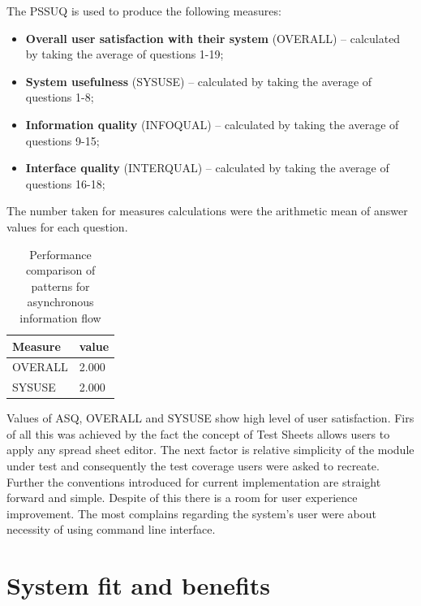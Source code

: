 The PSSUQ is used to produce the following measures:
\begin{itemize}
	\item \textbf{Overall user satisfaction with their system} (OVERALL) – calculated by taking the average of questions 1-19;
	\item  \textbf{System usefulness} (SYSUSE) – calculated by taking the average of questions 1-8;
	\item \textbf{Information quality} (INFOQUAL) – calculated by taking the average of questions 9-15;
	\item \textbf{Interface quality} (INTERQUAL) – calculated by taking the average of questions 16-18;
\end{itemize}

The number taken for measures calculations were the arithmetic mean of answer values for each question.
\begin{table}[h]
	\begin{center}
		\begin{tabular}{| l | l |  }
			\hline
			\textbf{Measure} & \textbf{value} \\
			\hline
			OVERALL & 2.000  \\
			\hline
			SYSUSE & 2.000  \\
			\hline
		\end{tabular}
	\end{center}
	\caption{Performance comparison of patterns for asynchronous information flow}
\end{table}

Values of ASQ, OVERALL and SYSUSE show high level of user satisfaction.
Firs of all this was achieved by the fact the concept of Test Sheets allows users to apply any spread sheet editor. The next factor is relative simplicity of the module under test and consequently the test coverage users were asked to recreate. Further the conventions introduced for current implementation are straight forward and simple. Despite of this there is a room for user experience improvement. The most complains regarding the system's user were about necessity of using command line interface.

\chapter{System fit and benefits}
\label{chap:fitsBenefits}

